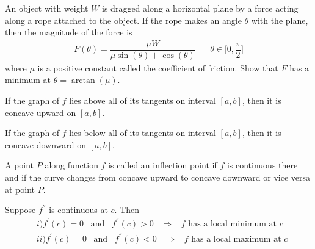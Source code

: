 \begin{exercise}
An object with weight $W$ is dragged along a horizontal plane by a force acting along a rope attached to the object. If the rope makes an angle $\theta$ with the plane, then the magnitude of the force is 
\begin{align*}
    F(\theta) = \dfrac{\mu W}{\mu \sin(\theta) + \cos(\theta)} \hspace{20pt} \theta \in \Big[0, \dfrac{\pi}{2}\Big] 
\end{align*}
where $\mu$ is a positive constant called the coefficient of friction. Show that $F$ has a minimum at $\theta = \arctan(\mu)$.
\end{exercise}

\begin{definition}
If the graph of $f$ lies above all of its tangents on interval $[a, b]$, then it is concave upward on $[a, b]$.
\end{definition}

\begin{definition}
If the graph of $f$ lies below all of its tangents on interval $[a, b]$, then it is concave downward on $[a, b]$.
\end{definition}

\begin{definition}
A point $P$ along function $f$ is called an inflection point if $f$ is continuous there and if the curve changes from concave upward to concave downward or vice versa at point $P$.
\end{definition}

\begin{theorem}
Suppose $f^{''}$ is continuous at $c$. Then
\begin{align*}
    &i) f^{'}(c) = 0 \hspace{10pt} \text{and} \hspace{10pt} f^{''}(c) > 0 \hspace{10pt} \Longrightarrow \hspace{10pt} f \hspace{4pt} \text{has a local minimum at} \hspace{4pt} c\\[2ex]
    &ii) f^{'}(c) = 0 \hspace{10pt} \text{and} \hspace{10pt} f^{''}(c) < 0 \hspace{10pt} \Longrightarrow \hspace{10pt} f \hspace{4pt} \text{has a local maximum at} \hspace{4pt} c\\[2ex]
\end{align*}
\end{theorem}

